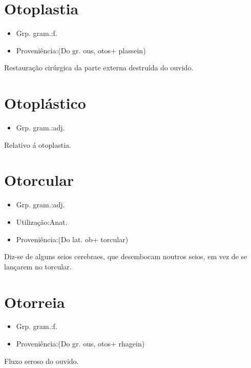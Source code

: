 \section{Otoplastia}
\begin{itemize}
\item {Grp. gram.:f.}
\end{itemize}
\begin{itemize}
\item {Proveniência:(Do gr. \textunderscore ous\textunderscore , \textunderscore otos\textunderscore  + \textunderscore plassein\textunderscore )}
\end{itemize}
Restauração cirúrgica da parte externa destruída do ouvido.
\section{Otoplástico}
\begin{itemize}
\item {Grp. gram.:adj.}
\end{itemize}
Relativo á otoplastia.
\section{Otorcular}
\begin{itemize}
\item {Grp. gram.:adj.}
\end{itemize}
\begin{itemize}
\item {Utilização:Anat.}
\end{itemize}
\begin{itemize}
\item {Proveniência:(Do lat. \textunderscore ob\textunderscore  + \textunderscore torcular\textunderscore )}
\end{itemize}
Diz-se de alguns seios cerebraes, que desembocam noutros seios, em vez de se lançarem no torcular.
\section{Otorreia}
\begin{itemize}
\item {Grp. gram.:f.}
\end{itemize}
\begin{itemize}
\item {Proveniência:(Do gr. \textunderscore ous\textunderscore , \textunderscore otos\textunderscore  + \textunderscore rhagein\textunderscore )}
\end{itemize}
Fluxo seroso do ouvido.
